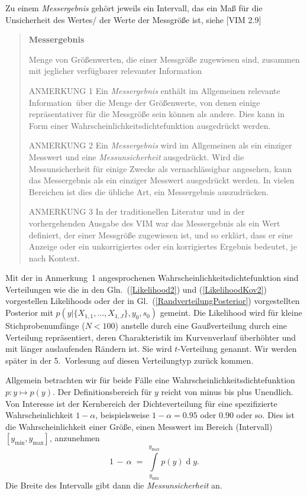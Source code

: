 Zu einem \textsl{Messergebnis} gehört jeweils ein Intervall, das ein Maß für die Unsicherheit
des Wertes/ der Werte der Messgröße ist, siehe [VIM 2.9]

\begin{quote}
\textbf{Messergebnis}

Menge von Größenwerten, die einer Messgröße zugewiesen sind, zusammen mit jeglicher
verfügbarer relevanter Information

ANMERKUNG 1 Ein \textsl{Messergebnis} enthält im Allgemeinen \glqq relevante Information\grqq ~über
die Menge der Größenwerte, von denen einige repräsentativer für die Messgröße sein können als andere.
Dies kann in Form einer Wahrscheinlichkeitsdichtefunktion ausgedrückt werden.

ANMERKUNG 2 Ein \textsl{Messergebnis} wird im Allgemeinen
als ein einziger Messwert und eine \textsl{Messunsicherheit}
ausgedrückt. Wird die Messunsicherheit für einige
Zwecke als vernachlässigbar angesehen, kann das
Messergebnis als ein einziger Messwert ausgedrückt
werden. In vielen Bereichen ist dies die übliche Art, ein
Messergebnis auszudrücken.

ANMERKUNG 3 In der traditionellen Literatur und in der
vorhergehenden Ausgabe des VIM war das Messergebnis
als ein Wert definiert, der einer Messgröße zugewiesen
ist, und so erklärt, dass er eine Anzeige oder ein
unkorrigiertes oder ein korrigiertes Ergebnis bedeutet, je
nach Kontext.
\end{quote}

Mit der in Anmerkung~1 angesprochenen Wahrscheinlichkeitsdichtefunktion sind Verteilungen wie
die in den Gln.~(\ref{Likelihood2}) und (\ref{LikelihoodKov2}) vorgestellen Likelihoods oder
der in Gl.~(\ref{RandverteilungPosterior}) vorgestellten Posterior
mit $p(y | \{X_{1,1}, \dots, X_{1,J}\}, y_0, s_0)$ gemeint. Die Likelihood wird
für kleine Stich\-proben\-um\-fänge ($N < 100$) anstelle durch eine Gaußverteilung durch eine Verteilung
repräsentiert, deren Charakteristik im Kurvenverlauf
überhöhter und mit länger auslaufenden Rändern ist. Sie wird $t$-Verteilung genannt.
Wir werden später in der 5.\ Vorlesung auf diesen Verteilungtyp zurück kommen.

Allgemein betrachten wir für beide Fälle eine Wahrscheinlichkeitsdichtefunktion $p \! : y \mapsto p(y)$.
Der Definitionsbereich für $y$ reicht von minus bis plus Unendlich. Von Interesse ist der Kernbereich
der Dichteverteilung für eine spezifizierte Wahrscheinlichkeit $1-\alpha$, beispielsweise
$1-\alpha = 0.95$ oder $0.90$ oder so.
Dies ist die Wahrscheinlichkeit einer Größe, einen Messwert im Bereich (Intervall) $[y_\mathrm{min}, y_\mathrm{max}]$,
anzunehmen
\begin{equation}
1 \, - \, \alpha \; = \;
\int\limits_{y_\mathrm{min}}^{y_\mathrm{max}} p(y)
\operatorname{d}y .
\label{UeberdeckungWahrscheinlichkeit}
\end{equation}
Die Breite des Intervalls gibt dann die \textsl{Messunsicherheit} an.


